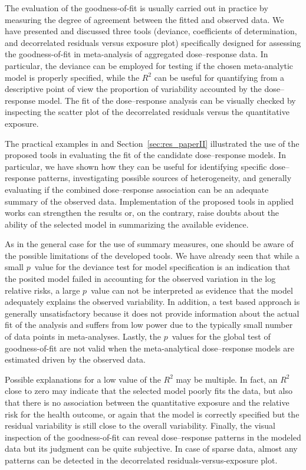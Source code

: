 \documentclass[11pt,a4paper,twoside,openany]{book}\usepackage{knitr}
\begin{document}
{{The evaluation of the goodness-of-fit is usually carried out in practice by measuring the degree of agreement between the fitted and observed data. We have presented and discussed three tools (deviance, coefficients of determination, and decorrelated residuals versus exposure plot) specifically designed for assessing the goodness-of-fit in meta-analysis of aggregated dose--response data. In particular, the deviance can be employed for testing if the chosen meta-analytic model is properly specified, while the $R^2$ can be useful for quantifying from a descriptive point of view the proportion of variability accounted by the dose--response model. The fit of the dose--response analysis can be visually checked by inspecting the scatter plot of the decorrelated residuals versus the quantitative exposure.

The practical examples in  and Section~\ref{sec:res_paperII} illustrated the use of the proposed tools in evaluating the fit of the candidate dose--response models. In particular, we have shown how they can be useful for identifying specific dose--response patterns, investigating possible sources of heterogeneity, and generally evaluating if the combined dose--response association can be an adequate summary of the observed data. Implementation of the proposed tools in applied works can strengthen the results or, on the contrary, raise doubts about the ability of the selected model in summarizing the available evidence. 

As in the general case for the use of summary measures, one should be aware of the possible limitations of the developed tools.
We have already seen that while a small $p$~value for the deviance test for model specification is an indication that the posited model failed in accounting for the observed variation in the log relative risks, a large $p$~value can not be interpreted as evidence that the model adequately explains the observed variability. In addition, a test based approach is generally unsatisfactory because it does not provide information about the actual fit of the analysis and suffers from low power due to the typically small number of data points in meta-analyses. Lastly, the $p$~values for the global test of goodness-of-fit are not valid when the meta-analytical dose--response models are estimated driven by the observed data.

Possible explanations for a low value of the $R^2$ may be multiple. In fact, an $R^2$ close to zero may indicate that the selected model poorly fits the data, but also that there is no association between the quantitative exposure and the relative risk for the health outcome, or again that the model is correctly specified but the residual variability is still close to the overall variability. Finally, the visual inspection of the goodness-of-fit can reveal dose--response patterns in the modeled data but its judgment can be quite subjective. In case of sparse data, almost any patterns can be detected in the decorrelated residuals-versus-exposure plot.

}}
\end{document}

